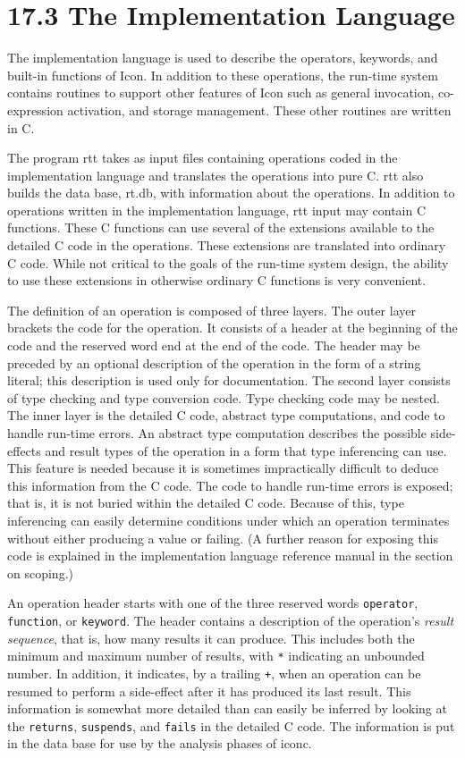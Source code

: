 \section[17.3 The Implementation Language]{17.3 The Implementation Language}

The implementation language is used to describe the operators,
keywords, and built-in functions of Icon. In addition to these
operations, the run-time system contains routines to support other
features of Icon such as general invocation, co-expression activation,
and storage management. These other routines are written in C.

The program rtt takes as input files containing operations coded in
the implementation language and translates the operations into pure
C. rtt also builds the data base, rt.db, with information about the
operations. In addition to operations written in the implementation
language, rtt input may contain C functions. These C functions can use
several of the extensions available to the detailed C code in the
operations. These extensions are translated into ordinary C
code. While not critical to the goals of the run-time system design,
the ability to use these extensions in otherwise ordinary C functions
is very convenient.

The definition of an operation is composed of three layers. The outer
layer brackets the code for the operation. It consists of a header at
the beginning of the code and the reserved word end at the end of the
code. The header may be preceded by an optional description of the
operation in the form of a string literal; this description is used
only for documentation. The second layer consists of type checking and
type conversion code. Type checking code may be nested.  The inner
layer is the detailed C code, abstract type computations, and code to
handle run-time errors. An abstract type computation describes the
possible side-effects and result types of the operation in a form that
type inferencing can use. This feature is needed because it is
sometimes impractically difficult to deduce this information from the
C code. The code to handle run-time errors is exposed; that is, it is
not buried within the detailed C code. Because of this, type
inferencing can easily determine conditions under which an operation
terminates without either producing a value or failing. (A further
reason for exposing this code is explained in the implementation
language reference manual in the section on scoping.)

An operation header starts with one of the three reserved words
\texttt{operator}, \texttt{function}, or \texttt{keyword}.
The header contains a description of the operation's
\textit{result sequence}, that is, how many results it can produce.
This includes both the minimum and maximum number of results, with
\texttt{*} indicating an unbounded number. In addition, it indicates,
by a trailing \texttt{+}, when an operation can be resumed to perform
a side-effect after it has produced its last result. This information
is somewhat more detailed than can easily be inferred by looking at
the \texttt{returns}, \texttt{suspends}, and \texttt{fails} in the
detailed C code. The information is put in the data base for use by
the analysis phases of iconc.

